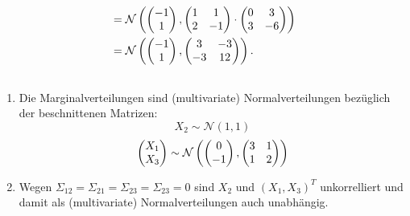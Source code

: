 \documentclass[a4paper]{article}
\begin{document}
\begin{enumerate}
\begin{align*}
        &= \mathcal{N}\left( \left(\begin{matrix}-1 \\ 1\end{matrix}\right), \left(\begin{matrix}1 & 1 \\ 2 & -1\end{matrix}\right) \cdot \left(\begin{matrix}0 & 3 \\ 3 & -6\end{matrix}\right) \right)\\
        &= \mathcal{N}\left( \left(\begin{matrix}-1 \\ 1\end{matrix}\right), \left(\begin{matrix}3 & -3 \\ -3 & 12\end{matrix}\right) \right)\text{.}
    \end{align*}
\end{enumerate}

\subsection{}

\begin{enumerate}
    \item Die Marginalverteilungen sind (multivariate) Normalverteilungen bezüglich der beschnittenen Matrizen:
    \begin{equation*}
        X_2 \sim \mathcal{N}(1, 1)
    \end{equation*}
    \begin{equation*}
        \left(\begin{matrix}X_1 \\ X_3\end{matrix}\right) \sim \mathcal{N}\left(\left(\begin{matrix}0 \\ -1\end{matrix}\right), \left(\begin{matrix}3 & 1 \\ 1 & 2\end{matrix}\right)\right)
    \end{equation*}
    \item Wegen $\Sigma_{12} = \Sigma_{21} = \Sigma_{23} = \Sigma_{23} = 0$ sind $X_2$ und $(X_1, X_3)^T$ unkorrelliert und damit als (multivariate) Normalverteilungen auch unabhängig.
\end{enumerate}
\end{document}
